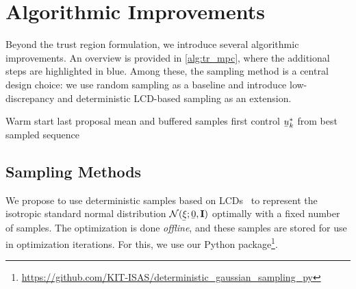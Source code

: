 \section{Algorithmic Improvements}
\label{sec:alg_improvements}

Beyond the trust region formulation, we introduce several algorithmic improvements.
An overview is provided in \cref{alg:tr_mpc}, where the additional steps are highlighted in {\color{myblue}blue}.
Among these, the sampling method is a central design choice: we use random sampling as a baseline and introduce low-discrepancy and deterministic \ac{LCD}-based sampling as an extension.

\begin{algorithm}[t]
    \small
    \caption{Trust Region MPC Step}
    \label{alg:tr_mpc} 
    {\color{myblue} Warm start last proposal mean and buffered samples}\;
    \Return first control $\vu_k^*$ from best sampled sequence
\end{algorithm}

\subsection{Sampling Methods}
\label{sec:alg_improvements:lcd_samples}
We propose to use deterministic samples based on \acp{LCD}~\cite{CDC09_HanebeckHuber} to represent the isotropic standard normal distribution $\mathcal{N}(\vVarCem;\vzero,\mI)$ optimally with a fixed number of samples. 
The optimization is done \emph{offline}, and these samples are stored for use in optimization iterations. 
For this, we use our Python package\footnote{\url{https://github.com/KIT-ISAS/deterministic_gaussian_sampling_py}}.

